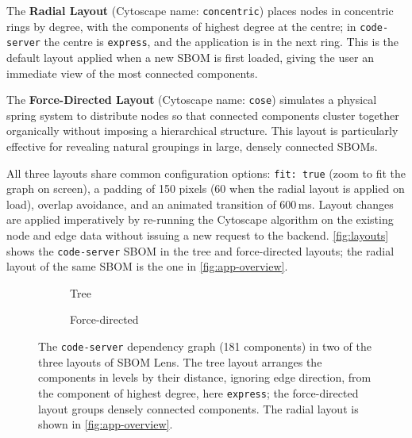 The \textbf{Radial Layout} (Cytoscape name: \texttt{concentric}) places nodes in concentric rings by degree, with the components of highest degree at the centre; in \texttt{code-server} the centre is \texttt{express}, and the application is in the next ring. This is the default layout applied when a new SBOM is first loaded, giving the user an immediate view of the most connected components.

The \textbf{Force-Directed Layout} (Cytoscape name: \texttt{cose}) simulates a physical spring system to distribute nodes so that connected components cluster together organically without imposing a hierarchical structure. This layout is particularly effective for revealing natural groupings in large, densely connected SBOMs.

All three layouts share common configuration options: \texttt{fit: true} (zoom to fit the graph on screen), a padding of 150 pixels (60 when the radial layout is applied on load), overlap avoidance, and an animated transition of 600\,ms. Layout changes are applied imperatively by re-running the Cytoscape algorithm on the existing node and edge data without issuing a new request to the backend. \autoref{fig:layouts} shows the \texttt{code-server} SBOM in the tree and force-directed layouts; the radial layout of the same SBOM is the one in \autoref{fig:app-overview}.

\begin{figure}[!htpb]
    \centering
    \begin{subfigure}[b]{0.49\textwidth}
        \centering
        \caption{Tree}
        \label{fig:layout-tree}
    \end{subfigure}
    \hfill
    \begin{subfigure}[b]{0.49\textwidth}
        \centering
        \caption{Force-directed}
        \label{fig:layout-force}
    \end{subfigure}
    \caption[The tree and force-directed layouts]{The \texttt{code-server} dependency graph (181 components) in two of the three layouts of SBOM Lens. The tree layout arranges the components in levels by their distance, ignoring edge direction, from the component of highest degree, here \texttt{express}; the force-directed layout groups densely connected components. The radial layout is shown in \autoref{fig:app-overview}.}
    \label{fig:layouts}
\end{figure}


